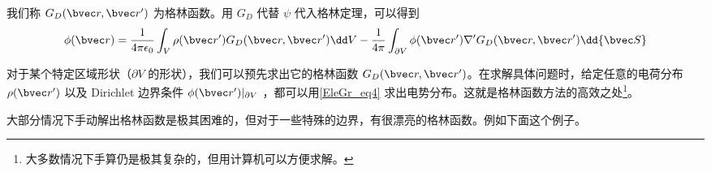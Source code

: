 我们称 $G_D(\bvec r,\bvec r')$ 为格林函数。用 $G_D$ 代替 $\psi$ 代入格林定理，可以得到
\begin{equation}\label{EleGr_eq4}
\phi(\bvec r)=\frac{1}{4\pi\epsilon_0}\int_V \rho(\bvec r')G_D(\bvec r,\bvec r')\dd V-\frac{1}{4\pi}\int_{\partial V} \phi(\bvec r')\nabla'G_D(\bvec r,\bvec r')\dd {\bvec S}
\end{equation}

对于某个特定区域形状（$\partial V$ 的形状），我们可以预先求出它的格林函数 $G_D(\bvec r,\bvec r')$。在求解具体问题时，给定任意的电荷分布 $\rho(\bvec r')$ 以及 Dirichlet 边界条件 $\phi(\bvec r')|_{\partial V}$ ，都可以用\autoref{EleGr_eq4} 求出电势分布。这就是格林函数方法的高效之处\footnote{大多数情况下手算仍是极其复杂的，但用计算机可以方便求解。}。

大部分情况下手动解出格林函数是极其困难的，但对于一些特殊的边界，有很漂亮的格林函数。例如下面这个例子。

